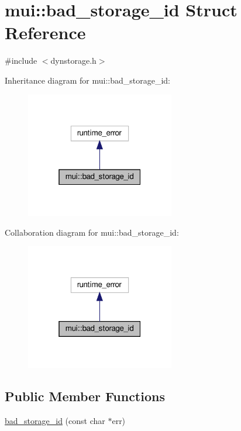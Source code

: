 \hypertarget{structmui_1_1bad__storage__id}{}\section{mui\+:\+:bad\+\_\+storage\+\_\+id Struct Reference}
\label{structmui_1_1bad__storage__id}


{\ttfamily \#include $<$dynstorage.\+h$>$}



Inheritance diagram for mui\+:\+:bad\+\_\+storage\+\_\+id\+:
\nopagebreak
\begin{figure}[H]
\begin{center}
\leavevmode
\includegraphics[width=184pt]{structmui_1_1bad__storage__id__inherit__graph}
\end{center}
\end{figure}


Collaboration diagram for mui\+:\+:bad\+\_\+storage\+\_\+id\+:
\nopagebreak
\begin{figure}[H]
\begin{center}
\leavevmode
\includegraphics[width=184pt]{structmui_1_1bad__storage__id__coll__graph}
\end{center}
\end{figure}
\subsection*{Public Member Functions}
\begin{DoxyCompactItemize}
\item 
\hyperlink{structmui_1_1bad__storage__id_a5daf39721cbd9687cf9351d609386f9c}{bad\+\_\+storage\+\_\+id} (const char $\ast$err)
\end{DoxyCompactItemize}


